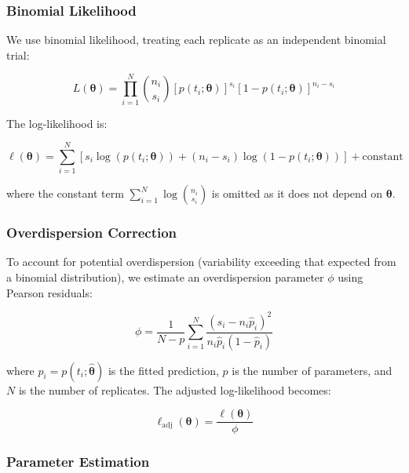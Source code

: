 \documentclass[11pt]{article}
\begin{document}
\subsubsection{Binomial Likelihood}

We use binomial likelihood, treating each replicate as an independent binomial trial:

\begin{equation}
L(\boldsymbol{\theta}) = \prod_{i=1}^{N} \binom{n_i}{s_i} [p(t_i; \boldsymbol{\theta})]^{s_i} [1-p(t_i; \boldsymbol{\theta})]^{n_i-s_i}
\end{equation}

The log-likelihood is:

\begin{equation}
\ell(\boldsymbol{\theta}) = \sum_{i=1}^{N} \left[ s_i \log(p(t_i; \boldsymbol{\theta})) + (n_i-s_i) \log(1-p(t_i; \boldsymbol{\theta})) \right] + \text{constant}
\end{equation}

where the constant term $\sum_{i=1}^{N} \log \binom{n_i}{s_i}$ is omitted as it does not depend on $\boldsymbol{\theta}$.

\subsubsection{Overdispersion Correction}

To account for potential overdispersion (variability exceeding that expected from a binomial distribution), we estimate an overdispersion parameter $\phi$ using Pearson residuals:

\begin{equation}
\phi = \frac{1}{N - p} \sum_{i=1}^{N} \frac{(s_i - n_i \hat{p}_i)^2}{n_i \hat{p}_i (1 - \hat{p}_i)}
\end{equation}

where $\hat{p}_i = p(t_i; \hat{\boldsymbol{\theta}})$ is the fitted prediction, $p$ is the number of parameters, and $N$ is the number of replicates. The adjusted log-likelihood becomes:

\begin{equation}
\ell_{\text{adj}}(\boldsymbol{\theta}) = \frac{\ell(\boldsymbol{\theta})}{\phi}
\end{equation}

\subsubsection{Parameter Estimation}
\end{document}
